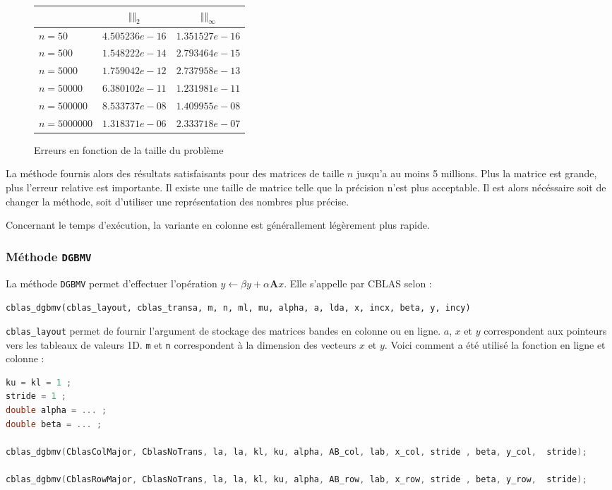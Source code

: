 \documentclass[12pt]{report}
\newcommand{\A}{\mathbf{A}}
\begin{document}
\begin{figure}[H]
\centering
\begin{tabular}{|l|c|c|}
\hline
~ & $\Vert \Vert_2$ & $\Vert \Vert_{\infty}$ \\ \hline
$n = 50$  &$4.505236e-16$&$1.351527e-16$\\ \hline
$n = 500$&$1.548222e-14$&$2.793464e-15$\\ \hline
$n = 5000$&$1.759042e-12$&$2.737958e-13$\\ \hline
$n = 50000$&$6.380102e-11$&$1.231981e-11$\\ \hline
$n = 500000$&$8.533737e-08$&$1.409955e-08$\\ \hline
$n = 5000000$&$1.318371e-06$&$2.333718e-07$\\ \hline
\end{tabular}
\caption{Erreurs en fonction de la taille du problème}
\end{figure}

La méthode fournis alors des résultats satisfaisants pour des matrices de taille $n$ jusqu'a au moins 5 millions. Plus la matrice est grande, plus l'erreur relative est importante. Il existe une taille de matrice telle que la précision n'est plus acceptable. Il est alors nécéssaire soit de changer la méthode, soit d'utiliser une représentation des nombres plus précise.

Concernant le temps d'exécution, la variante en colonne est générallement légèrement plus rapide. 


\subsubsection{Méthode \texttt{DGBMV}}

La méthode \texttt{DGBMV} permet d'effectuer l'opération $y \leftarrow \beta y + \alpha \A x$. Elle s'appelle par CBLAS selon : 

\texttt{cblas\_dgbmv(cblas\_layout, cblas\_transa, m, n, ml, mu, alpha, a, lda, x, incx, beta, y, incy)}

\texttt{cblas\_layout} permet de fournir l'argument de stockage des matrices bandes en colonne ou en ligne. $a$, $x$ et $y$ correspondent aux pointeurs vers les tableaux de valeurs 1D.  \texttt{m} et \texttt{n} correspondent à la dimension des vecteurs $x$ et $y$. Voici comment a été utilisé la fonction en ligne et colonne : 


\begin{lstlisting}[language=C, caption=Utilisation de DGBMV]
ku = kl = 1 ; 
stride = 1 ; 
double alpha = ... ; 
double beta = ... ; 

cblas_dgbmv(CblasColMajor, CblasNoTrans, la, la, kl, ku, alpha, AB_col, lab, x_col, stride , beta, y_col,  stride); 

cblas_dgbmv(CblasRowMajor, CblasNoTrans, la, la, kl, ku, alpha, AB_row, lab, x_row, stride , beta, y_row,  stride);
\end{lstlisting}
\end{document}
